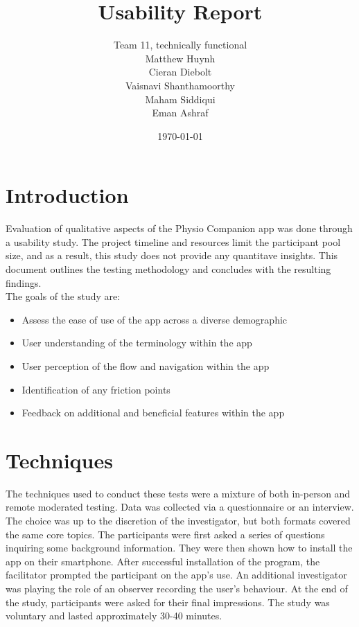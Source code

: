 \documentclass[12pt, titlepage]{article}
\newcommand{\authname}{Team 11, technically functional
\\ Matthew Huynh
\\ Cieran Diebolt
\\ Vaisnavi Shanthamoorthy 
\\ Maham Siddiqui
\\ Eman Ashraf}%
\begin{document}
\title{Usability Report}
\author{\authname}
\date{\today}

\maketitle
\newpage
\tableofcontents
\newpage

\section{Introduction}
Evaluation of qualitative aspects of the Physio Companion app was done through a usability study.
The project timeline and resources limit the participant pool size, and as a result,
this study does not provide any quantitave insights.
This document outlines the testing methodology and concludes with the resulting findings. \\
The goals of the study are: 
\begin{itemize}
    \item Assess the ease of use of the app across a diverse demographic
    \item User understanding of the terminology within the app
    \item User perception of the flow and navigation within the app
    \item Identification of any friction points 
    \item Feedback on additional and beneficial features within the app
\end{itemize}

\section{Techniques}
The techniques used to conduct these tests were a mixture of both in-person and remote moderated testing. Data was
collected via a questionnaire or an interview. The choice was up to the discretion of the investigator, but both formats covered
the same core topics.
The participants were first asked a series of questions inquiring some background information. 
They were then shown how to install the app on their smartphone. After successful installation of the program, the facilitator prompted
the participant on the app's use. An additional investigator was playing the role of an observer recording the user's behaviour. 
At the end of the study, participants were asked for their final impressions. The study was voluntary and lasted approximately 30-40 minutes.
\end{document}
